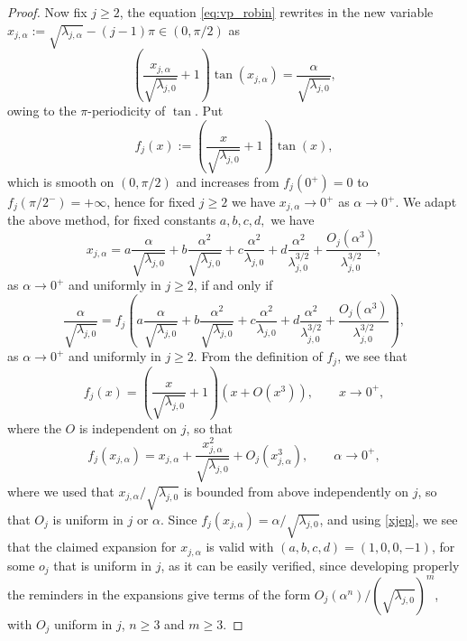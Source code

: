 \documentclass[10pt,a4paper]{amsart}
\begin{document}
\begin{proof}
Now fix $j \geq 2$, the equation \eqref{eq:vp_robin} rewrites in the new variable $x_{j,\alpha} := \sqrt{\lambda_{j,\alpha}} - (j-1)\pi \in (0,\pi/2)$ as
\[
\left( \frac{x_{j,\alpha}}{\sqrt{\lambda_{j,0}}} + 1 \right) \tan(x_{j,\alpha}) = \frac{\alpha}{\sqrt{\lambda_{j,0}}},
\]
owing to the $\pi$-periodicity of $\tan$. Put 
\[
f_j(x) := \left( \frac{x}{\sqrt{\lambda_{j,0}}} + 1 \right) \tan(x),
\]
which is smooth on $(0,\pi/2)$ and increases from $f_j(0^+) = 0$ to $f_j(\pi/2^-) = +\infty$, hence for fixed $j \geq 2$ we have $x_{j,\alpha} \to 0^+$ as $\alpha \to 0^+$. We adapt the above method, for fixed constants $a,b,c,d,$ we have
\begin{equation}\label{xjep}
x_{j,\alpha} = a \frac{\alpha}{\sqrt{\lambda_{j,0}}} + b \frac{\alpha^2}{\sqrt{\lambda_{j,0}}} + c \frac{\alpha^2}{\lambda_{j,0}} + d \frac{\alpha^2}{\lambda_{j,0}^{3/2}} + \frac{O_j(\alpha^3)}{\lambda_{j,0}^{3/2}},
\end{equation}
as $\alpha \to 0^+$ and uniformly in $j \geq 2$, if and only if 
\[
\frac{\alpha}{\sqrt{\lambda_{j,0}}} = f_j\left(  a \frac{\alpha}{\sqrt{\lambda_{j,0}}} + b \frac{\alpha^2}{\sqrt{\lambda_{j,0}}} + c \frac{\alpha^2}{\lambda_{j,0}} + d \frac{\alpha^2}{\lambda_{j,0}^{3/2}} + \frac{O_j(\alpha^3)}{\lambda_{j,0}^{3/2}} \right),
\]
as $\alpha \to 0^+$ and uniformly in $j \geq 2$. From the definition of $f_j$, we see that
\[
f_j(x) = \left( \frac{x}{\sqrt{\lambda_{j,0}}} + 1 \right)\left(
x + O(x^3)\right),
\qquad x \to 0^+,
\]
where the $O$ is independent on $j$,
so that
\[
f_j(x_{j,\alpha})
=
x_{j,\alpha}+\frac{x_{j,\alpha}^2}{\sqrt{\lambda_{j,0}}}
+O_j(x_{j,\alpha}^3),
\qquad  \alpha \to 0^+,
\]
where we used that $x_{j,\alpha}/\sqrt{\lambda_{j,0}}$ is bounded from above independently on $j$,  so that  $O_j$ is uniform in $j$ or $\alpha$.
Since $f_j(x_{j,\alpha})={\alpha}/{\sqrt{\lambda_{j,0}}}$, and using \eqref{xjep}, we see that the claimed expansion for $x_{j,\alpha}$ is valid with $(a,b,c,d) = (1,0,0,-1)$, for some $o_j$ that is uniform in $j$, as it can be easily verified, since developing properly the reminders in the expansions give terms of the form $O_j(\alpha^n)/(\sqrt{\lambda_{j,0}})^m$, with $O_j$ uniform in $j$, $n\geqslant 3$ and $m\geqslant 3$.
\end{proof}
\end{document}
